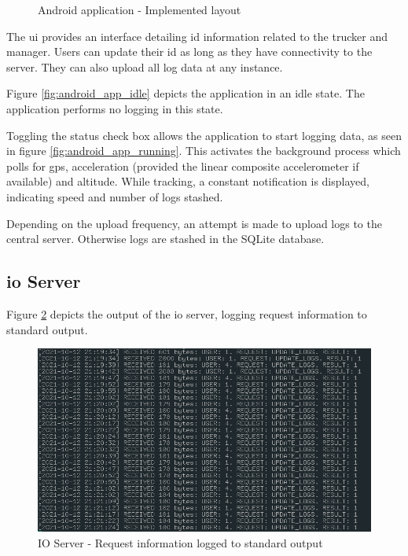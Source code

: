 \begin{figure}[H]
{        \label{fig:android_app_stashing}
    }
\caption{Android application - Implemented layout}
\label{fig:android_app_implementation}
\end{figure}

The \ac{ui} provides an interface detailing \ac{id} information related to the trucker and manager.
Users can update their \ac{id} as long as they have connectivity to the server.
They can also upload all log data at any instance.

Figure \ref{fig:android_app_idle} depicts the application in an idle state.
The application performs no logging in this state.

Toggling the status check box allows the application to start logging data, as seen in figure \ref{fig:android_app_running}.
This activates the background process which polls for \ac{gps}, acceleration (provided the linear composite accelerometer if available) and altitude.
While tracking, a constant notification is displayed, indicating speed and number of logs stashed.

Depending on the upload frequency, an attempt is made to upload logs to the central server.
Otherwise logs are stashed in the SQLite database.

\subsection{\Ac{io} Server}
Figure \ref{fig:io_output} depicts the output of the \ac{io} server, logging request information to standard output.

\begin{figure}[H]
\centering
\includegraphics[scale=0.60]{io_output.png}
\caption{IO Server - Request information logged to standard output}
\label{fig:io_output}
\end{figure}

